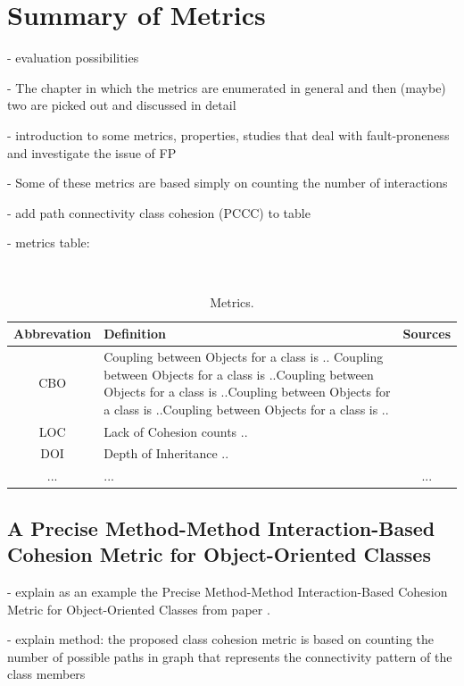 \section{Summary of Metrics}\label{analysis}

- evaluation possibilities

- The chapter in which the metrics are enumerated in general and then (maybe) two are picked out and discussed in detail

- introduction to some metrics, properties, studies that deal with fault-proneness and investigate the issue of FP

- Some of these metrics are based simply on counting the number of interactions

- add path connectivity class cohesion (PCCC) to table

- metrics table:

\begin{table}
	\caption{Metrics.}~\label{tab:metrics}
	
	\setlength\tabcolsep{3pt}
	\renewcommand{\arraystretch}{1.4}%
	\begin{tabularx}{\columnwidth}{ | c | p{5.8cm} || c | }
		\hline
		Abbrevation & Definition & Sources \\ \hline\hline
		CBO & Coupling between Objects for a class is .. Coupling between Objects for a class is ..Coupling between Objects for a class is ..Coupling between Objects for a class is ..Coupling between Objects for a class is ..& \cite{b14chidamber1994metrics} \\ \hline
		LOC & Lack of Cohesion counts ..  & \cite{b15chidamber1991towards} \\ \hline
		DOI & Depth of Inheritance .. & \cite{b15chidamber1991towards} \\ \hline
		... & ... & ... \\ \hline
	\end{tabularx}
\end{table}


\subsection{A Precise Method-Method Interaction-Based Cohesion Metric for Object-Oriented Classes}

- explain as an example the Precise Method-Method Interaction-Based Cohesion Metric for Object-Oriented Classes from paper \cite{b8al2012precise}.

- explain method: the proposed class cohesion metric is based on counting the number of possible paths in graph that represents the connectivity pattern of the class members

